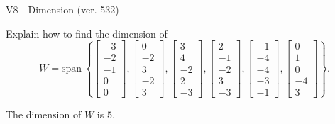 \begin{exercise}
  \begin{exerciseTitle}V8 - Dimension (ver. 532)\end{exerciseTitle}
  \begin{exerciseStatement}
    Explain how to find the dimension of 
\[W=\mathrm{span}\ \left\{\left[\begin{array}{r}
-3 \\
-2 \\
-1 \\
0 \\
0
\end{array}\right] , \left[\begin{array}{r}
0 \\
-2 \\
3 \\
-2 \\
3
\end{array}\right] , \left[\begin{array}{r}
3 \\
4 \\
-2 \\
2 \\
-3
\end{array}\right] , \left[\begin{array}{r}
2 \\
-1 \\
-2 \\
3 \\
-3
\end{array}\right] , \left[\begin{array}{r}
-1 \\
-4 \\
-4 \\
-3 \\
-1
\end{array}\right] , \left[\begin{array}{r}
0 \\
1 \\
0 \\
-4 \\
3
\end{array}\right]\right\}.\]



  \end{exerciseStatement}
  \begin{exerciseAnswer}
   The dimension of \(W\) is  \(5\).
  


  \end{exerciseAnswer}
\end{exercise}